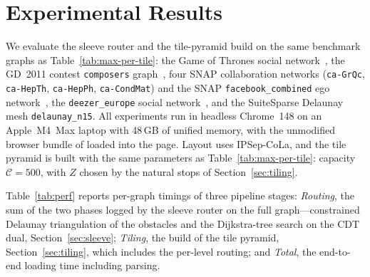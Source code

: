\documentclass[a4paper,USenglish,anonymous]{gd-lipics-v3}
\newcommand{\msagljs}{\textsf{\libname}}
\begin{document}
\section{Experimental Results}
\label{sec:experiments}

We evaluate the sleeve router and the tile-pyramid build on the same benchmark graphs as Table~\ref{tab:max-per-tile}: the Game of Thrones social network~\cite{beveridge2018game}, the GD~2011 contest \texttt{composers} graph~\cite{composers}, four SNAP collaboration networks (\texttt{ca-GrQc}, \texttt{ca-HepTh}, \texttt{ca-HepPh}, \texttt{ca-CondMat}) and the SNAP \texttt{facebook\_combined} ego network~\cite{leskovec2007graph,fb}, the \texttt{deezer\_europe} social network~\cite{feather}, and the SuiteSparse Delaunay mesh \texttt{delaunay\_n15}. All experiments run in headless Chrome~148 on an Apple~M4~Max laptop with 48\,GB of unified memory, with the unmodified browser bundle of \msagljs{} loaded into the page. Layout uses IPSep-CoLa, and the tile pyramid is built with the same parameters as Table~\ref{tab:max-per-tile}: capacity~$\mathcal{C}=500$, with $Z$ chosen by the natural stops of Section~\ref{sec:tiling}.

Table~\ref{tab:perf} reports per-graph timings of three pipeline stages: \emph{Routing}, the sum of the two phases logged by the sleeve router on the full graph---constrained Delaunay triangulation of the obstacles and the Dijkstra-tree search on the CDT dual, Section~\ref{sec:sleeve}; \emph{Tiling}, the build of the tile pyramid, Section~\ref{sec:tiling}, which includes the per-level routing; and \emph{Total}, the end-to-end loading time including parsing.
\end{document}
